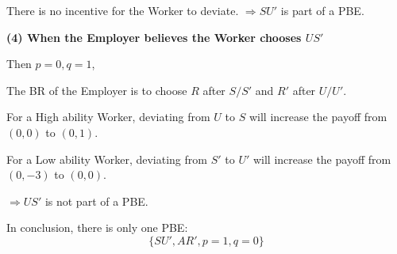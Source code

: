 \documentclass{article}
\begin{document}
\smallskip

There is no incentive for the Worker to deviate.
$\Rightarrow SU'$ is part of a PBE.

\medskip

\textbf{(4) When the Employer believes the Worker chooses $US'$}

\smallskip

Then $p=0,q=1$,

\smallskip

The BR of the Employer is to choose $R$ after $S/S'$ and $R'$ after $U/U'$.

\smallskip

For a High ability Worker, deviating from $U$ to $S$ will increase the payoff from $(0,0)$ to $(0,1)$.

\smallskip

For a Low ability Worker, deviating from $S'$ to $U'$ will increase the payoff from $(0,-3)$ to $(0,0)$.

\smallskip

$\Rightarrow US'$ is not part of a PBE.

\medskip

In conclusion, there is only one PBE:
$$\{SU',AR',p=1,q=0\}$$
\end{document}
